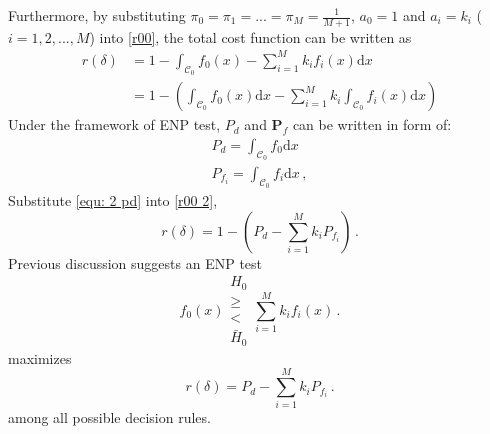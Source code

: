 Furthermore, by substituting $\pi_0 = \pi_1 = ... = \pi_M = \frac{1}{M+1}$, $a_0 = 1$  and $a_i = k_i$ ($i = 1, 2, ..., M$) into \eqref{r00}, the total cost function can be written as
\begin{equation}
\label{r00 2}
\begin{split}
r(\delta)&= 1 - \int_{\mathcal{C}_0}f_0(x) - \sum_{i=1}^{M}k_if_i(x)\mathrm{d}x\\
&= 1 - (\int_{\mathcal{C}_0}f_0(x)\mathrm{d}x - \sum_{i=1}^{M}k_i\int_{\mathcal{C}_0}f_i(x)\mathrm{d}x)
\end{split}
\end{equation}
Under the framework of ENP test, $P_d$ and $\mathbf{P}_f$ can be written in form of: 
\begin{equation}
\begin{split}
\label{equ: 2 pd}
P_d = \int_{\mathcal{C}_0}f_0\mathrm{d}x\\
P_{f_i} = \int_{\mathcal{C}_0}f_i\mathrm{d}x \,,
\end{split}
\end{equation}
Substitute \eqref{equ: 2 pd} into \eqref{r00 2},
\begin{equation}
\label{r00 3}
r(\delta) = 1 - (P_d - \sum_{i=1}^{M}k_iP_{f_i})\,.
\end{equation}
Previous discussion suggests an ENP test 
\[
f_0(x) \substack{H_0 \\ \geq \\ < \\ \bar{H}_0} \sum_{i=1}^{M}k_if_i(x)\,. 
\]
maximizes 
\[
r(\delta) = P_d - \sum_{i=1}^{M}k_iP_{f_i}\,.
\]
among all possible decision rules.

